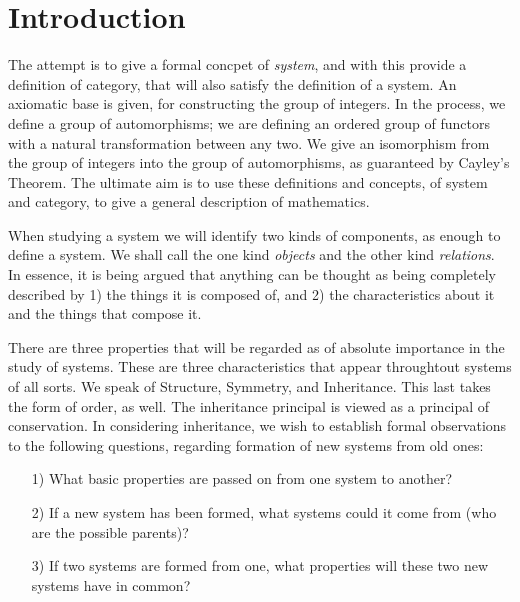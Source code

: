 \documentclass [12pt]{book}
\begin{document}
\def\cents{\hbox{\rm\rlap/c}}
\def\miss{\hbox{\vrule height2pt width 2pt depth0pt}}

\def\vvert{\Vert}                %

\def\tcol#1{{\baselineskip=6pt \vcenter{#1}} \Column}

\def\dB{\hbox{{}}}                 %
\def\mB#1{\hbox{$#1$}}             %
\def\nB#1{\hbox{#1}}               %

\newpage

\chapter*{Introduction}

The attempt is to give a formal concpet of \textit{system}, and with this provide a definition of category, that will also satisfy the definition of a system. An axiomatic base is given, for constructing the group of integers. In the process, we define a group of automorphisms; we are defining an ordered group of functors with a natural transformation between any two. We give an isomorphism from the group of integers into the group of automorphisms, as guaranteed by Cayley's Theorem. The ultimate aim is to use these definitions and concepts, of system and category, to give a general description of mathematics.

When studying a system we will identify two kinds of components, as enough to define a system. We shall call the one kind \textit{objects} and the other kind \textit{relations}. In essence, it is being argued that anything can be thought as being completely described by 1) the things it is composed of, and  2) the characteristics about it and the things that compose it.

There are three properties that will be regarded as of absolute importance in the study of systems. These are three characteristics that appear throughtout systems of all sorts. We speak of Structure, Symmetry, and Inheritance. This last takes the form of order, as well. The inheritance principal is viewed as a principal of conservation. In considering inheritance, we wish to establish formal observations to the following questions, regarding formation of  new systems from old ones: 

\begin{itemize}\item[1)]What basic properties are passed on from one system to another? \item[2)]If a new system has been formed, what systems could it come from (who are the possible parents)? \item[3)]If two systems are formed from one, what properties will these two new systems have in common? 
\end{itemize}
\end{document}
